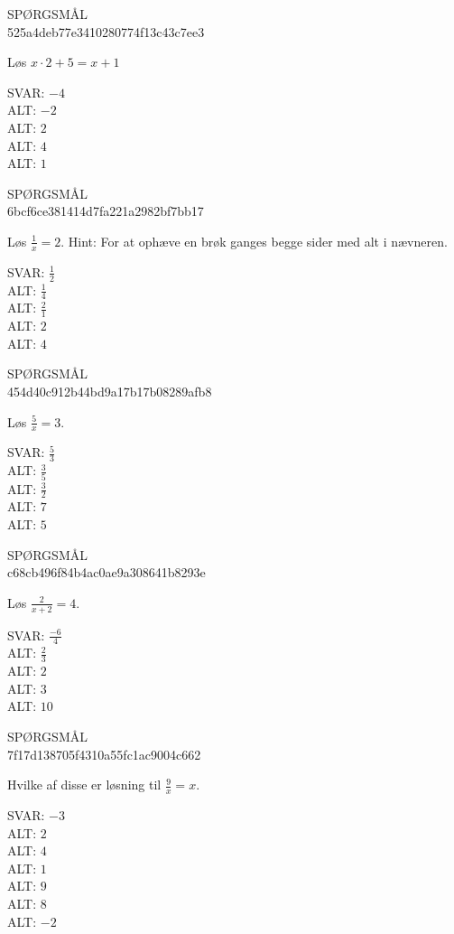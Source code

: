 \documentclass[]{article}
\newenvironment{question}[2]{SPØRGSMÅL\\}{\hspace{50px}}
\newcommand{\answer}[1]{{\color{green} SVAR: #1}\\}
\newcommand{\alt}[1]{{\color{red} ALT: #1}\\}
\begin{document}
\begin{question}{multi}\id{525a4deb77e3410280774f13c43c7ee3}
    
    Løs $x\cdot 2+5=x+1$
    
    \answer{$-4$}
    \alt{$-2$}
    \alt{$2$}
    \alt{$4$}
    \alt{$1$}
    
\end{question}

\begin{question}{multi}\id{6bcf6ce381414d7fa221a2982bf7bb17}
    
    Løs $\frac{1}{x}=2$. Hint: For at ophæve en brøk ganges begge sider med alt i nævneren.
    
    \answer{$\frac{1}{2}$}
    \alt{$\frac{1}{4}$}
    \alt{$\frac{2}{1}$}
    \alt{$2$}
    \alt{$4$}
    
\end{question}

\begin{question}{multi}\id{454d40c912b44bd9a17b17b08289afb8}
    
    Løs $\frac{5}{x}=3$.
    
    \answer{$\frac{5}{3}$}
    \alt{$\frac{3}{5}$}
    \alt{$\frac{3}{2}$}
    \alt{$7$}
    \alt{$5$}
    
\end{question}

\begin{question}{multi}\id{c68cb496f84b4ac0ae9a308641b8293e}
    
    Løs $\frac{2}{x+2}=4$.
    
    \answer{$\frac{-6}{4}$}
    \alt{$\frac{2}{3}$}
    \alt{$2$}
    \alt{$3$}
    \alt{$10$}
    
\end{question}

\begin{question}{multi}\id{7f17d138705f4310a55fc1ac9004c662}
    
    Hvilke af disse er løsning til $\frac{9}{x}=x$.
    
    \answer{$-3$}
    \alt{$2$}
    \alt{$4$}
    \alt{$1$}
    \alt{$9$}
    \alt{$8$}
    \alt{$-2$}
    
\end{question}
\end{document}

